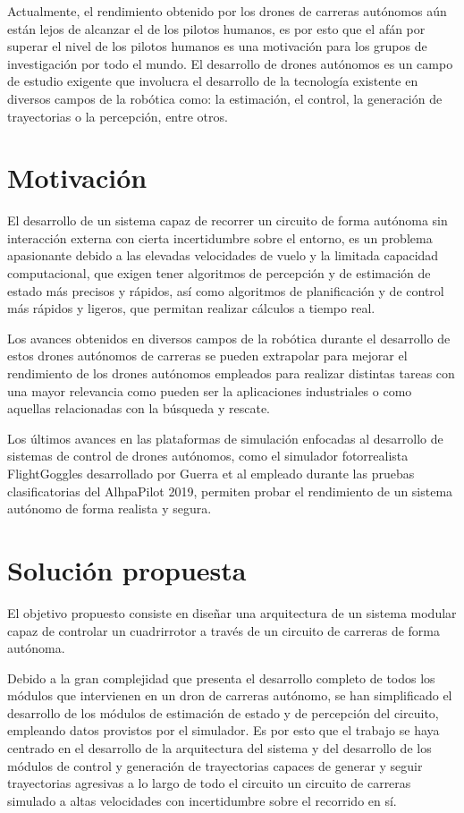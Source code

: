 Actualmente, el rendimiento obtenido por los drones de carreras autónomos aún están lejos de alcanzar el de los pilotos humanos, es por esto que el afán por superar el nivel de los pilotos humanos es una motivación para los grupos de investigación por todo el mundo. El desarrollo de drones autónomos es un campo de estudio exigente que involucra el desarrollo de la tecnología existente en diversos campos de la robótica como: la estimación, el control, la generación de trayectorias o la percepción, entre otros. 

\section{Motivación}

El desarrollo de un sistema capaz de recorrer un circuito de forma autónoma sin interacción externa con cierta incertidumbre sobre el entorno, es un problema apasionante debido a las elevadas velocidades de vuelo y la limitada capacidad computacional, que exigen tener algoritmos de percepción y de estimación de estado más precisos y rápidos, así como algoritmos de planificación y de control más rápidos y ligeros, que permitan realizar cálculos a tiempo real.

Los avances obtenidos en diversos campos de la robótica durante el desarrollo de estos drones autónomos de carreras se pueden extrapolar para mejorar el rendimiento de los drones autónomos empleados para realizar distintas tareas con una mayor relevancia como pueden ser la aplicaciones industriales o como aquellas relacionadas con la búsqueda y rescate.

Los últimos avances en las plataformas de simulación enfocadas al desarrollo de sistemas de control de drones autónomos, como el simulador fotorrealista FlightGoggles desarrollado por Guerra et al \cite{guerra2019flightgoggles} empleado durante las pruebas clasificatorias del AlhpaPilot 2019, permiten probar el rendimiento de un sistema autónomo de forma realista y segura.



\section{Solución propuesta}
El objetivo propuesto consiste en diseñar una arquitectura de un sistema modular capaz de controlar un cuadrirrotor a través de un circuito de carreras de forma autónoma.

Debido a la gran complejidad que presenta el desarrollo completo de todos los módulos que intervienen en un dron de carreras autónomo, se han simplificado el desarrollo de los módulos de estimación de estado y de percepción del circuito, empleando datos provistos por el simulador. Es por esto que el trabajo se haya centrado en el desarrollo de la arquitectura del sistema y del desarrollo de los módulos de control y generación de trayectorias capaces de generar y seguir trayectorias agresivas a lo largo de todo el circuito un circuito de carreras simulado a altas velocidades con incertidumbre sobre el recorrido en sí.

